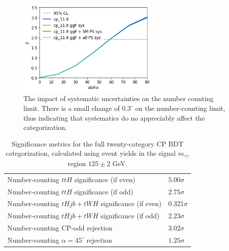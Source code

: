 \begin{figure}
  \centering
        \includegraphics[width=0.62\textwidth]{figures/tthcp_chapter/categorization_xgb/cp_11_syst.png}
  \caption{The impact of systematic uncertainties on the number counting limit. There is a small change of $0.3^\circ$ on the number-counting limit, thus indicating that systematics do no appreciably affect the categorization.}
  \label{fig:ncrej_syst}
\end{figure}


\begin{table}[ht]
\begin{center}
\begin{tabular}{ll}
Number-counting $ttH$ significance (if even)& $5.00\sigma$  \\
Number-counting $ttH$ significance (if odd)& $2.75\sigma$  \\
Number-counting $tHjb + tWH$ significance (if even)& 0.321$\sigma$  \\
Number-counting $tHjb+tWH$ significance (if odd)& $2.23\sigma$  \\ \hline
Number-counting CP-odd rejection & $3.02\sigma$ \\
Number-counting $\alpha=45^\circ$ rejection & $1.25\sigma$ \\ \hline
\hline
\end{tabular}
\end{center}
\vspace{-0.5cm}
\caption{Significance metrics for the full twenty-category CP BDT categorization, calculated using event yields in the signal $m_{\gamma\gamma}$ region $125\pm2$ GeV.}
\label{tab:sigs}
\end{table}
